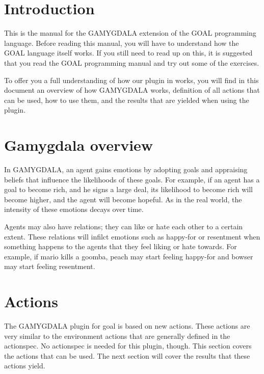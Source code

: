 \documentclass[11pt]{article}
\begin{document}
\section{Introduction}
This is the manual for the GAMYGDALA extension of the GOAL programming language. Before reading this manual, you will have to understand how the GOAL language itself works. If you still need to read up on this, it is suggested that you read the GOAL programming manual and try out some of the exercises.

To offer you a full understanding of how our plugin in works, you will find in this document an overview of how GAMYGDALA works, definition of all actions that can be used, how to use them, and the results that are yielded when using the plugin.

\section{Gamygdala overview}
In GAMYGDALA, an agent gains emotions by adopting goals and appraising beliefs that influence the likelihoods of these goals. For example, if an agent has a goal to become rich, and he signs a large deal, its likelihood to become rich will become higher, and the agent will become hopeful. As in the real world, the intensity of these emotions decays over time.

Agents may also have relations; they can like or hate each other to a certain extent. These relations will infilct emotions such as happy-for or resentment when something happens to the agents that they feel liking or hate towards. For example, if mario kills a goomba, peach may start feeling happy-for and bowser may start feeling resentment.

\section{Actions}
The GAMYGDALA plugin for goal is based on new actions. These actions are very similar to the environment actions that are generally defined in the actionspec. No actionspec is needed for this plugin, though.
This section covers the actions that can be used. The next section will cover the results that these actions yield.






\end{document}
